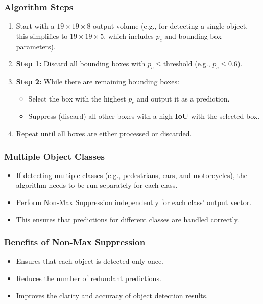 \documentclass[letterpaper,12pt,notitlepage,twoside]{report}
\begin{document}
\subsubsection*{Algorithm Steps}
\begin{enumerate}[nosep]
    \item Start with a $19 \times 19 \times 8$ output volume (e.g., for detecting a single object, this simplifies to $19 \times 19 \times 5$, which includes $p_c$ and bounding box parameters).
    \item \textbf{Step 1:} Discard all bounding boxes with $p_c \leq \text{threshold}$ (e.g., $p_c \leq 0.6$).
    \item \textbf{Step 2:} While there are remaining bounding boxes:
    \begin{itemize}
        \item Select the box with the highest $p_c$ and output it as a prediction.
        \item Suppress (discard) all other boxes with a high \textbf{IoU} with the selected box.
    \end{itemize}
    \item Repeat until all boxes are either processed or discarded.
\end{enumerate}

\subsubsection*{Multiple Object Classes}
\begin{itemize}[nosep]
    \item If detecting multiple classes (e.g., pedestrians, cars, and motorcycles), the algorithm needs to be run separately for each class.
    \item Perform Non-Max Suppression independently for each class' output vector.
    \item This ensures that predictions for different classes are handled correctly.
\end{itemize}

\subsubsection*{Benefits of Non-Max Suppression}
\begin{itemize}[nosep]
    \item Ensures that each object is detected only once.
    \item Reduces the number of redundant predictions.
    \item Improves the clarity and accuracy of object detection results.
\end{itemize}
\end{document}
